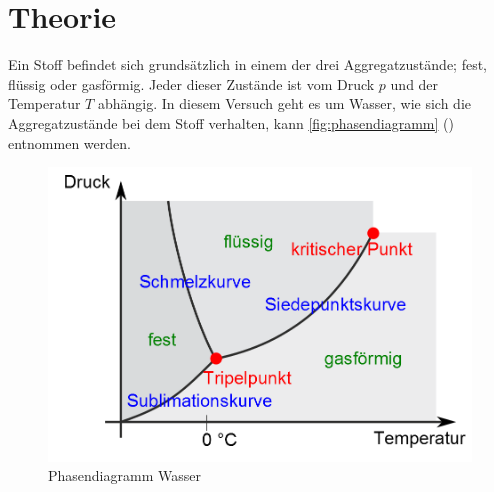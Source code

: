 \section{Theorie}
\label{sec:Theorie}

Ein Stoff befindet sich grundsätzlich in einem der drei Aggregatzustände;
fest, flüssig oder gasförmig. Jeder dieser Zustände ist vom Druck $p$ und
der Temperatur $T$ abhängig. In diesem Versuch geht es um Wasser, wie sich 
die Aggregatzustände bei dem Stoff verhalten, kann \autoref{fig:phasendiagramm}
(\cite{phasendiagramm}) entnommen werden. 
\begin{figure}[h]
    \centering
        \centering
        \includegraphics[width=\textwidth]{Bilder/aggregatzustand.png}
        \caption{Phasendiagramm Wasser}
    \hfill
    \label{fig:phasendiagramm}
\end{figure}